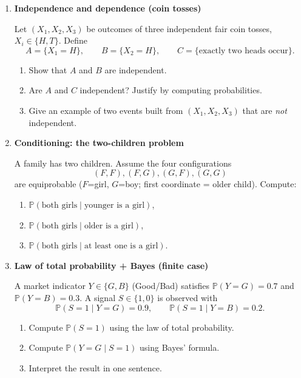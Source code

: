\documentclass[11pt]{article}
\begin{document}
\begin{enumerate}[leftmargin=*, itemsep=1.2em]
\bigskip

\item \textbf{Independence and dependence (coin tosses)}

Let $(X_1,X_2,X_3)$ be outcomes of three independent fair coin tosses, $X_i\in\{H,T\}$.
Define
\[
A=\{X_1=H\},\qquad
B=\{X_2=H\},\qquad
C=\{\text{exactly two heads occur}\}.
\]
\begin{enumerate}[label=(\alph*)]
\item Show that $A$ and $B$ are independent.
\item Are $A$ and $C$ independent? Justify by computing probabilities.
\item Give an example of two events built from $(X_1,X_2,X_3)$ that are \emph{not} independent.
\end{enumerate}

\bigskip

\item \textbf{Conditioning: the two-children problem}

A family has two children. Assume the four configurations
\[
(F,F), (F,G), (G,F), (G,G)
\]
are equiprobable ($F$=girl, $G$=boy; first coordinate = older child).
Compute:
\begin{enumerate}[label=(\alph*)]
\item $\mathbb{P}(\text{both girls}\mid \text{younger is a girl})$,
\item $\mathbb{P}(\text{both girls}\mid \text{older is a girl})$,
\item $\mathbb{P}(\text{both girls}\mid \text{at least one is a girl})$.
\end{enumerate}

\bigskip

\item \textbf{Law of total probability + Bayes (finite case)}

A market indicator $Y\in\{G,B\}$ (Good/Bad) satisfies
$\mathbb{P}(Y=G)=0.7$ and $\mathbb{P}(Y=B)=0.3$.
A signal $S\in\{1,0\}$ is observed with
\[
\mathbb{P}(S=1\mid Y=G)=0.9,
\qquad
\mathbb{P}(S=1\mid Y=B)=0.2.
\]
\begin{enumerate}[label=(\alph*)]
\item Compute $\mathbb{P}(S=1)$ using the law of total probability.
\item Compute $\mathbb{P}(Y=G\mid S=1)$ using Bayes' formula.
\item Interpret the result in one sentence.
\end{enumerate}


\end{enumerate}
\end{document}
